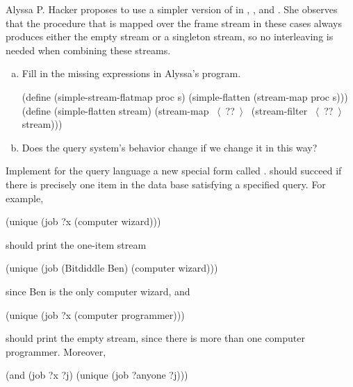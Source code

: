 \begin{exerciseGroup}
\label{Exercise 4.74}
 Alyssa P. Hacker proposes to use
a simpler version of  in , ,
and .  She observes that the procedure that is mapped
over the frame stream in these cases always produces either the empty stream or
a singleton stream, so no interleaving is needed when combining these streams.

\begin{enumerate}[a.]

\item
Fill in the missing expressions in Alyssa's program.

\begin{codeBlock}
(define (simple-stream-flatmap proc s)
  (simple-flatten (stream-map proc s)))
(define (simple-flatten stream)
  (stream-map ~\(\langle \)~??~\(\rangle \)~
              (stream-filter ~\(\langle \)~??~\(\rangle \)~ stream)))
\end{codeBlock}

\item
Does the query system's behavior change if we change it in this way?

\end{enumerate}

\label{Exercise 4.75}
 Implement for the query language
a new special form called .   should succeed if there
is precisely one item in the data base satisfying a specified query.  For
example,

\begin{codeBlock}
(unique (job ?x (computer wizard)))
\end{codeBlock}

\noindent
should print the one-item stream

\begin{codeBlock}
(unique (job (Bitdiddle Ben) (computer wizard)))
\end{codeBlock}

\noindent
since Ben is the only computer wizard, and

\begin{codeBlock}
(unique (job ?x (computer programmer)))
\end{codeBlock}

\noindent
should print the empty stream, since there is more than one computer
programmer.  Moreover,

\begin{codeBlock}
(and (job ?x ?j) (unique (job ?anyone ?j)))
\end{codeBlock}


\end{exerciseGroup}
